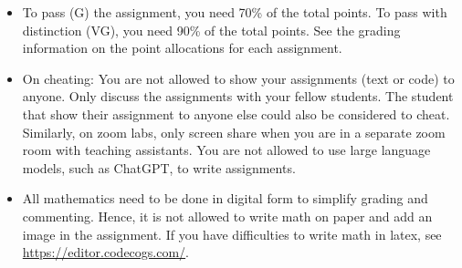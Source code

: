 \begin{itemize}
\item To pass (G) the assignment, you need 70\% of the total points. To pass with distinction (VG), you need 90\% of the total points. See the grading information on the point allocations for each assignment.
\item On cheating: You are not allowed to show your assignments (text or code) to anyone. Only discuss the assignments with your fellow students. The student that show their assignment to anyone else could also be considered to cheat. Similarly, on zoom labs, only screen share when you are in a separate zoom room with teaching assistants. You are not allowed to use large language models, such as ChatGPT, to write assignments.
\item All mathematics need to be done in digital form to simplify grading and commenting. Hence, it is not allowed to write math on paper and add an image in the assignment. If you have difficulties to write math in latex, see \href{https://editor.codecogs.com/}{https://editor.codecogs.com/}.
\end{itemize}


